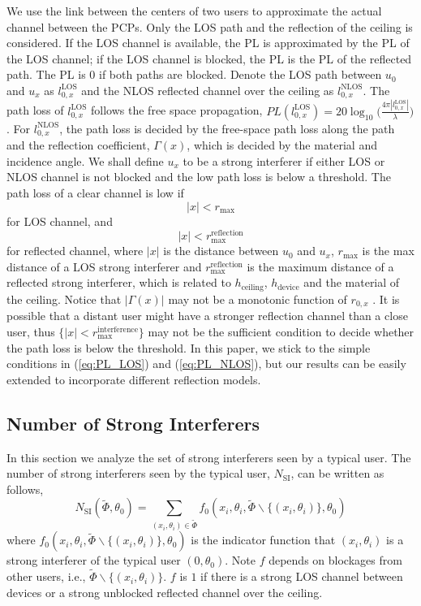 \documentclass[10pt, conference, letterpaper]{IEEEtran}
\DeclareMathOperator*{\LOS}{\mathrm{LOS}}
\begin{document}
We use the link between the centers of two users to approximate the actual channel between the PCPs.
Only the LOS path and the reflection of the ceiling is considered. If the LOS channel is available, the PL is approximated by the PL of the LOS channel; if the LOS channel is blocked, the PL is the PL of the reflected path. The PL is 0 if both paths are blocked. 
Denote the LOS path between $u_0$ and $u_x$ as $l_{0,x}^{\mathrm{LOS}}$ and the NLOS reflected channel over the ceiling as $l_{0,x}^{\mathrm{NLOS}}$. 
The path loss of $l_{0,x}^{\mathrm{LOS}}$ follows the free space propagation, $PL(l_{0,x}^{\LOS}) = 20\log_{10}\big(\frac{4\pi |l_{0,x}^{\LOS}|}{\lambda}\big)$. 
For $l_{0,x}^{\mathrm{NLOS}}$, the path loss is decided by the free-space path loss along the path and the reflection coefficient, $\Gamma(x)$, which is decided by the material and incidence angle. 
We shall define $u_x$ to be a strong interferer if either LOS or NLOS channel is not blocked and the low path loss is below a threshold. The path loss of a clear channel is low if  
\begin{equation}\label{eq:PL_LOS}
|x| < r_{\max}
\end{equation}
for LOS channel, and 
\begin{equation}\label{eq:PL_NLOS}
|x| < r_{\max}^{\mathrm{reflection}}
\end{equation}
for reflected channel, where $|x|$ is the distance between $u_0$ and $u_x$, $r_{\max}$ is the max distance of a LOS strong interferer and $r_{\max}^{\mathrm{reflection}}$ is the maximum distance of a reflected strong interferer, which is related to $h_{\mathrm{ceiling}}$, $h_{\mathrm{device}}$ and the material of the ceiling. 
Notice that $|\Gamma(x)|$ may not be a monotonic function of $r_{0,x}$ \cite{reflection}. 
It is possible that a distant user might have a stronger reflection channel than a close user, thus $\{|x|<r_{\max}^{\mathrm{interference}}\}$ may not be the sufficient condition to decide whether the path loss is below the threshold. 
In this paper, we stick to the simple conditions in (\ref{eq:PL_LOS}) and (\ref{eq:PL_NLOS}), but our results can be easily extended to incorporate different reflection models.


\subsection{Number of Strong Interferers}
In this section we analyze the set of strong interferers seen by a typical user. The number of strong interferers seen by the typical user, $N_{\mathrm{SI}}$, can be written as follows, 
\begin{equation}
N_{\mathrm{SI}}(\tilde{\Phi}, \theta_0) = \sum_{(x_i, \theta_i)\in \tilde{\Phi}}f_0(x_i, \theta_i, \tilde{\Phi}\backslash\{(x_i,\theta_i)\}, \theta_0)
\end{equation}
where $f_0(x_i, \theta_i, \tilde{\Phi}\backslash\{(x_i,\theta_i)\}, \theta_0)$ is the indicator function that $(x_i, \theta_i)$ is a strong interferer of the typical user $(0,\theta_0)$. 
Note $f$ depends on blockages from other users, i.e., $\tilde{\Phi}\backslash\{(x_i,\theta_i)\}$. $f$ is $1$ if there is a strong LOS channel between devices or a strong unblocked reflected channel over the ceiling.
\end{document}
